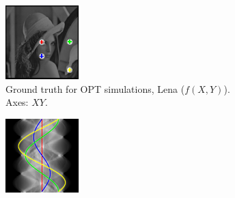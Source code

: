 \begin{figure}
  \centering
  \hfill
  \begin{subfigure}[t]{0.3\textwidth}
    \includegraphics[width=\textwidth]{Chapters/flopt/Figs/PDF/results/no_helix/rawinput_colour}
    \caption{Ground truth for OPT simulations, Lena (\(f(X,Y)\)). Axes: \(XY\).}
    \label{fig:raw_input}
  \end{subfigure}\hfill
  \begin{subfigure}[t]{0.3\textwidth}
    \includegraphics[width=\textwidth]{Chapters/flopt/Figs/PDF/results/no_helix/sinugram_stretch}

\end{subfigure}
\end{figure}
